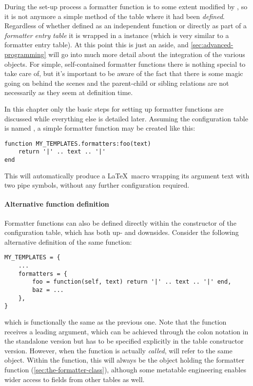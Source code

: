 \documentclass{scrartcl}
\begin{document}
During the set-up process a formatter function is to some extent modified by
, so it is not anymore a simple method of the
 table where it had been \emph{defined}.
Regardless of whether defined as an independent function or directly as part of
a \emph{formatter entry table} it is wrapped in a
 instance (which is very similar to a formatter entry table).
At this point this is just an aside, and \vref{sec:advanced-programming} will go
into much more detail about the integration of the various objects.  For simple,
self-contained formatter functions there is nothing special to take care of, but
it's important to be aware of the fact that there is some magic going on behind
the scenes and the parent-child or sibling relations are not necessarily as they
seem at definition time.

In this chapter only the basic steps for setting up formatter functions are
discussed while everything else is detailed later.  Assuming the configuration
table is named , a simple formatter function may be
created like this:

\begin{verbatim}
function MY_TEMPLATES.formatters:foo(text)
    return '|' .. text .. '|'
end
\end{verbatim}

\noindent This will automatically produce
a \LaTeX\ macro  wrapping its argument
text with two pipe symbols, without any further configuration required.


\paragraph{Alternative function definition}

Formatter functions can also be defined directly within the constructor of the
configuration table, which has both up- and downsides.  Consider the following
alternative definition of the same function:

\begin{verbatim}
MY_TEMPLATES = {
    ...
    formatters = {
        foo = function(self, text) return '|' .. text .. '|' end,
        baz = ...
    },
}
\end{verbatim}

\noindent which is functionally the same as the previous one.  Note that the
function receives a leading  argument, which can be achieved
through the colon notation in the standalone version but has to be specified
explicitly in the table constructor version.  However, when the function is
actually \emph{called},  will refer to the same object.  Within the
function, this will always be the  object holding the
formatter function (\vref{sec:the-formatter-class}), although some
metatable engineering enables wider access to fields from other tables as well.
\end{document}
